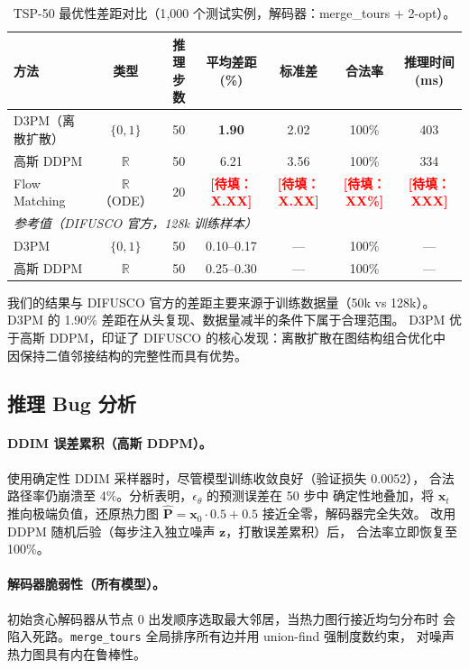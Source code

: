 \documentclass[11pt,a4paper]{article}
\newcommand{\TODO}[1]{\textcolor{red}{\textbf{[待填：#1]}}}
\begin{document}
\begin{table}[h]
\centering
\caption{TSP-50 最优性差距对比（1{,}000 个测试实例，解码器：merge\_tours + 2-opt）。}
\label{tab:main_zh}
\begin{tabular}{lcccccc}
\toprule
方法 & 类型 & 推理步数 & 平均差距 (\%) & 标准差 & 合法率 & 推理时间 (ms) \\
\midrule
D3PM（离散扩散）& $\{0,1\}$ & 50 & \textbf{1.90} & 2.02 & 100\% & 403 \\
高斯 DDPM      & $\mathbb{R}$ & 50 & 6.21 & 3.56 & 100\% & 334 \\
Flow Matching  & $\mathbb{R}$（ODE）& 20 & \TODO{X.XX} & \TODO{X.XX} & \TODO{XX\%} & \TODO{XXX} \\
\midrule
\multicolumn{7}{l}{\textit{参考值（DIFUSCO 官方，128k 训练样本）}} \\
D3PM           & $\{0,1\}$ & 50 & 0.10--0.17 & — & 100\% & — \\
高斯 DDPM      & $\mathbb{R}$ & 50 & 0.25--0.30 & — & 100\% & — \\
\bottomrule
\end{tabular}
\end{table}

我们的结果与 DIFUSCO 官方的差距主要来源于训练数据量（50k vs 128k）。
D3PM 的 1.90\% 差距在从头复现、数据量减半的条件下属于合理范围。
D3PM 优于高斯 DDPM，印证了 DIFUSCO 的核心发现：离散扩散在图结构组合优化中
因保持二值邻接结构的完整性而具有优势。

\subsection{推理 Bug 分析}
\label{sec:bugs_zh}

\paragraph{DDIM 误差累积（高斯 DDPM）。}
使用确定性 DDIM 采样器时，尽管模型训练收敛良好（验证损失 0.0052），
合法路径率仍崩溃至 4\%。分析表明，$\epsilon_\theta$ 的预测误差在 50 步中
确定性地叠加，将 $\mathbf{x}_t$ 推向极端负值，还原热力图 $\hat{\mathbf{P}} =
\mathbf{x}_0\cdot 0.5+0.5$ 接近全零，解码器完全失效。
改用 DDPM 随机后验（每步注入独立噪声 $\mathbf{z}$，打散误差累积）后，
合法率立即恢复至 100\%。

\paragraph{解码器脆弱性（所有模型）。}
初始贪心解码器从节点 0 出发顺序选取最大邻居，当热力图行接近均匀分布时
会陷入死路。\texttt{merge\_tours} 全局排序所有边并用 union-find 强制度数约束，
对噪声热力图具有内在鲁棒性。
\end{document}
